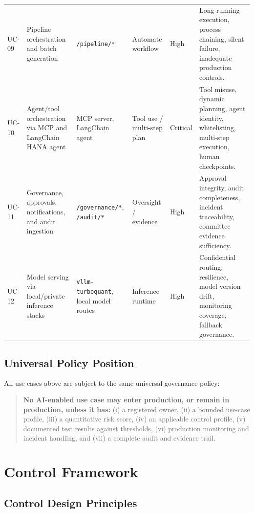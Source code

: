 \documentclass[11pt,a4paper]{article}
\begin{document}
\begin{longtable}{P{0.08\textwidth}P{0.23\textwidth}P{0.14\textwidth}P{0.10\textwidth}P{0.12\textwidth}P{0.23\textwidth}}
UC-09 & Pipeline orchestration and batch generation & \texttt{/pipeline/*} & Automate workflow & High & Long-running execution, process chaining, silent failure, inadequate production controls. \\
UC-10 & Agent/tool orchestration via MCP and LangChain HANA agent & MCP server, LangChain agent & Tool use / multi-step plan & Critical & Tool misuse, dynamic planning, agent identity, whitelisting, multi-step execution, human checkpoints. \\
UC-11 & Governance, approvals, notifications, and audit ingestion & \texttt{/governance/*}, \texttt{/audit/*} & Oversight / evidence & High & Approval integrity, audit completeness, incident traceability, committee evidence sufficiency. \\
UC-12 & Model serving via local/private inference stacks & \texttt{vllm-turboquant}, local model routes & Inference runtime & High & Confidential routing, resilience, model version drift, monitoring coverage, fallback governance. \\
\bottomrule
\end{longtable}

\subsection{Universal Policy Position}

All use cases above are subject to the same universal governance policy:

\begin{quote}
\textbf{No AI-enabled use case may enter production, or remain in production, unless it has:}
(i) a registered owner, (ii) a bounded use-case profile, (iii) a quantitative risk score, (iv) an applicable control profile, (v) documented test results against thresholds, (vi) production monitoring and incident handling, and (vii) a complete audit and evidence trail.
\end{quote}

\section{Control Framework}

\subsection{Control Design Principles}
\end{document}
